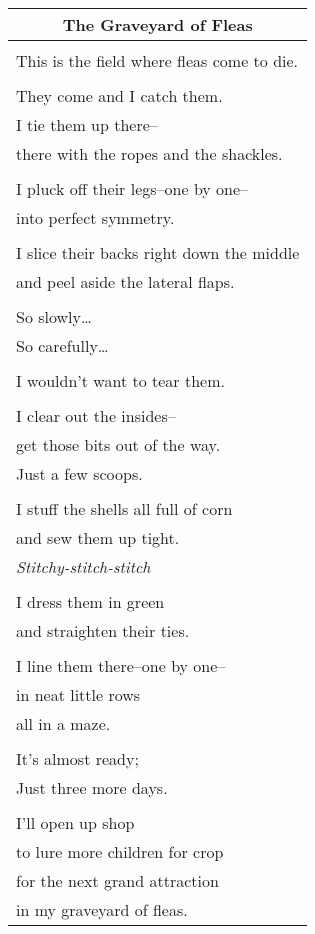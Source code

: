 \documentclass{article}
\begin{document}
\begin{center}
\begin{tabular}{l}
\multicolumn{1}{c}{\textbf{The Graveyard of Fleas}} \\ \hline
\\
This is the field where fleas come to die. \\
\\
They come and I catch them. \\
I tie them up there-- \\
there with the ropes and the shackles. \\
\\
I pluck off their legs--one by one-- \\
into perfect symmetry. \\
\\
I slice their backs right down the middle \\
and peel aside the lateral flaps. \\
\\
So slowly\ldots{} \\
So carefully\ldots{} \\
\\
I wouldn't want to tear them. \\
\\
I clear out the insides-- \\
get those bits out of the way. \\
Just a few scoops. \\
\\
I stuff the shells all full of corn \\
and sew them up tight. \\
\textit{Stitchy-stitch-stitch} \\
\\
I dress them in green \\
and straighten their ties. \\
\\
I line them there--one by one-- \\
in neat little rows \\
all in a maze. \\
\\
It's almost ready; \\
Just three more days. \\
\\
I'll open up shop \\
to lure more children for crop \\ %
for the next grand attraction \\ %
in my graveyard of fleas. \\
\end{tabular}
\end{center}
\end{document}
